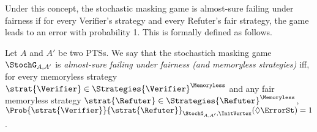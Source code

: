 
Under this concept, the stochastic masking game is almost-sure failing
under fairness if for every Verifier's strategy and every Refuter's
fair strategy, the game leads to an error with probability 1.  This is
formally defined as follows.



\begin{definition}
  Let $A$ and $A'$ be two PTSs.  We say that the stochastich masking
  game $\StochG_{A,A'}$ is \emph{almost-sure failing under fairness
  (and memoryless strategies)} iff, for every memoryless strategy
  $\strat{\Verifier} \in \Strategies{\Verifier}^{\Memoryless}$ and any
  fair memoryless strategy
  $\strat{\Refuter} \in \Strategies{\Refuter}^{\Memoryless}$,
  $\Prob{\strat{\Verifier}}{\strat{\Refuter}}_{\StochG_{A,A'}, \InitVertex}(\Diamond \ErrorSt)=1$.
\end{definition}





